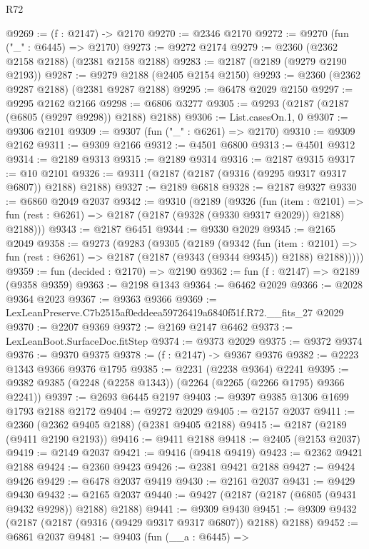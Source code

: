 \begin{lexlean}{R72}
\begin{coremodule}
@9269 := (f : @2147) -> @2170
@9270 := @2346 @2170
@9272 := @9270 (fun ("_" : @6445) => @2170)
@9273 := @9272 @2174
@9279 := @2360 (@2362 @2158 @2188) (@2381 @2158 @2188)
@9283 := @2187 (@2189 (@9279 @2190 @2193))
@9287 := @9279 @2188 (@2405 @2154 @2150)
@9293 := @2360 (@2362 @9287 @2188) (@2381 @9287 @2188)
@9295 := @6478 @2029 @2150
@9297 := @9295 @2162 @2166
@9298 := @6806 @3277
@9305 := @9293 (@2187 (@2187 (@6805 (@9297 @9298)) @2188) @2188)
@9306 := List.casesOn.{1, 0}
@9307 := @9306 @2101
@9309 := @9307 (fun ("_" : @6261) => @2170)
@9310 := @9309 @2162
@9311 := @9309 @2166
@9312 := @4501 @6800
@9313 := @4501 @9312
@9314 := @2189 @9313
@9315 := @2189 @9314
@9316 := @2187 @9315
@9317 := @10 @2101
@9326 := @9311 (@2187 (@2187 (@9316 (@9295 @9317 @9317 @6807)) @2188) @2188)
@9327 := @2189 @6818
@9328 := @2187 @9327
@9330 := @6860 @2049 @2037
@9342 := @9310
    (@2189
      (@9326
        (fun (item : @2101) =>
        fun (rest : @6261) => @2187 (@2187 (@9328 (@9330 @9317 @2029)) @2188) @2188)))
@9343 := @2187 @6451
@9344 := @9330 @2029
@9345 := @2165 @2049
@9358 := @9273
    (@9283
      (@9305
        (@2189
          (@9342
            (fun (item : @2101) =>
            fun (rest : @6261) => @2187 (@2187 (@9343 (@9344 @9345)) @2188) @2188)))))
@9359 := fun (decided : @2170) => @2190
@9362 := fun (f : @2147) => @2189 (@9358 @9359)
@9363 := @2198 @1343
@9364 := @6462 @2029
@9366 := @2028 @9364 @2023
@9367 := @9363 @9366
@9369 := LexLeanPreserve.C7b2515af0eddeea59726419a6840f51f.R72.__fits_27 @2029
@9370 := @2207 @9369
@9372 := @2169 @2147 @6462
@9373 := LexLeanBoot.SurfaceDoc.fitStep
@9374 := @9373 @2029
@9375 := @9372 @9374
@9376 := @9370 @9375
@9378 := (f : @2147) -> @9367 @9376
@9382 := @2223 @1343 @9366 @9376 @1795
@9385 := @2231 (@2238 @9364) @2241
@9395 := @9382 @9385 (@2248 (@2258 @1343)) (@2264 (@2265 (@2266 @1795) @9366 @2241))
@9397 := @2693 @6445 @2197
@9403 := @9397 @9385 @1306 @1699 @1793 @2188 @2172
@9404 := @9272 @2029
@9405 := @2157 @2037
@9411 := @2360 (@2362 @9405 @2188) (@2381 @9405 @2188)
@9415 := @2187 (@2189 (@9411 @2190 @2193))
@9416 := @9411 @2188
@9418 := @2405 (@2153 @2037)
@9419 := @2149 @2037
@9421 := @9416 (@9418 @9419)
@9423 := @2362 @9421 @2188
@9424 := @2360 @9423
@9426 := @2381 @9421 @2188
@9427 := @9424 @9426
@9429 := @6478 @2037 @9419
@9430 := @2161 @2037
@9431 := @9429 @9430
@9432 := @2165 @2037
@9440 := @9427 (@2187 (@2187 (@6805 (@9431 @9432 @9298)) @2188) @2188)
@9441 := @9309 @9430
@9451 := @9309 @9432 (@2187 (@2187 (@9316 (@9429 @9317 @9317 @6807)) @2188) @2188)
@9452 := @6861 @2037
@9481 := @9403
    (fun (__a : @6445) =>

\end{coremodule}
\end{lexlean}

